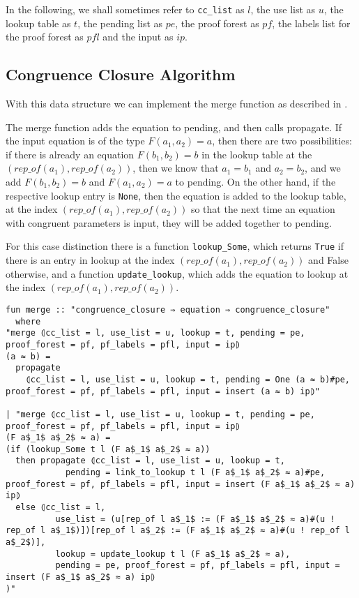 In the following, we shall sometimes refer to \lstinline{cc_list} as $l$, the use list as $u$, the lookup table as $t$, the pending list as $pe$, the proof forest as $pf$, the labels list for the proof forest as $pfl$ and the input as $ip$.

\subsection{Congruence Closure Algorithm}

With this data structure we can implement the merge function as described in \cite{Nieuwenhuis}.

The merge function adds the equation to pending, and then calls propagate. If the input equation is of the type $F(a_1, a_2) = a$, then there are two possibilities: if there is already an equation $F(b_1, b_2) = b$ in the lookup table at the $(rep\_of(a_1), rep\_of(a_2))$, then we know that $a_1 = b_1$ and $a_2 = b_2$, and we add $F(b_1, b_2) = b$ and $F(a_1, a_2) = a$ to pending.
On the other hand, if the respective lookup entry is \lstinline{None}, then the equation is added to the lookup table, at the index $(rep\_of(a_1), rep\_of(a_2))$ so that the next time an equation with congruent parameters is input, they will be added together to pending.

For this case distinction there is a function \lstinline{lookup_Some}, which returns \lstinline{True} if there is an entry in lookup at the index $(rep\_of(a_1), rep\_of(a_2))$ and False otherwise, and a function \lstinline{update_lookup}, which adds the equation to lookup at the index $(rep\_of(a_1), rep\_of(a_2))$.

\begin{lstlisting}
fun merge :: "congruence_closure ⇒ equation ⇒ congruence_closure"
  where
"merge ⦇cc_list = l, use_list = u, lookup = t, pending = pe, proof_forest = pf, pf_labels = pfl, input = ip⦈
(a ≈ b) =
  propagate
    ⦇cc_list = l, use_list = u, lookup = t, pending = One (a ≈ b)#pe, proof_forest = pf, pf_labels = pfl, input = insert (a ≈ b) ip⦈"

| "merge ⦇cc_list = l, use_list = u, lookup = t, pending = pe, proof_forest = pf, pf_labels = pfl, input = ip⦈
(F a$_1$ a$_2$ ≈ a) =
(if (lookup_Some t l (F a$_1$ a$_2$ ≈ a))
  then propagate ⦇cc_list = l, use_list = u, lookup = t,
            pending = link_to_lookup t l (F a$_1$ a$_2$ ≈ a)#pe, proof_forest = pf, pf_labels = pfl, input = insert (F a$_1$ a$_2$ ≈ a) ip⦈
  else ⦇cc_list = l,
          use_list = (u[rep_of l a$_1$ := (F a$_1$ a$_2$ ≈ a)#(u ! rep_of l a$_1$)])[rep_of l a$_2$ := (F a$_1$ a$_2$ ≈ a)#(u ! rep_of l a$_2$)],
          lookup = update_lookup t l (F a$_1$ a$_2$ ≈ a),
          pending = pe, proof_forest = pf, pf_labels = pfl, input = insert (F a$_1$ a$_2$ ≈ a) ip⦈
)"
\end{lstlisting}

